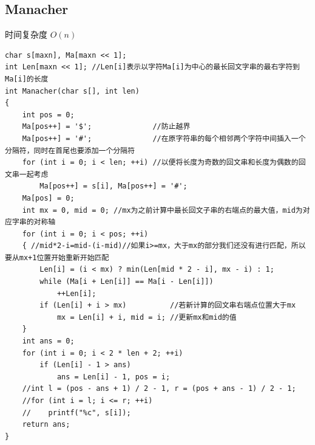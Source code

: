 \documentclass[twoside]{article}
\begin{document}
\subsection{Manacher}
时间复杂度 $O(n)$
\begin{lstlisting}
char s[maxn], Ma[maxn << 1];
int Len[maxn << 1]; //Len[i]表示以字符Ma[i]为中心的最长回文字串的最右字符到Ma[i]的长度
int Manacher(char s[], int len)
{
    int pos = 0;
    Ma[pos++] = '$';              //防止越界
    Ma[pos++] = '#';              //在原字符串的每个相邻两个字符中间插入一个分隔符，同时在首尾也要添加一个分隔符
    for (int i = 0; i < len; ++i) //以便将长度为奇数的回文串和长度为偶数的回文串一起考虑
        Ma[pos++] = s[i], Ma[pos++] = '#';
    Ma[pos] = 0;
    int mx = 0, mid = 0; //mx为之前计算中最长回文子串的右端点的最大值，mid为对应字串的对称轴
    for (int i = 0; i < pos; ++i)
    { //mid*2-i=mid-(i-mid)//如果i>=mx，大于mx的部分我们还没有进行匹配，所以要从mx+1位置开始重新开始匹配
        Len[i] = (i < mx) ? min(Len[mid * 2 - i], mx - i) : 1;
        while (Ma[i + Len[i]] == Ma[i - Len[i]])
            ++Len[i];
        if (Len[i] + i > mx)          //若新计算的回文串右端点位置大于mx
            mx = Len[i] + i, mid = i; //更新mx和mid的值
    }
    int ans = 0;
    for (int i = 0; i < 2 * len + 2; ++i)
        if (Len[i] - 1 > ans)
            ans = Len[i] - 1, pos = i;
    //int l = (pos - ans + 1) / 2 - 1, r = (pos + ans - 1) / 2 - 1;
    //for (int i = l; i <= r; ++i)
    //    printf("%c", s[i]);
    return ans;
}
\end{lstlisting}
\end{document}
